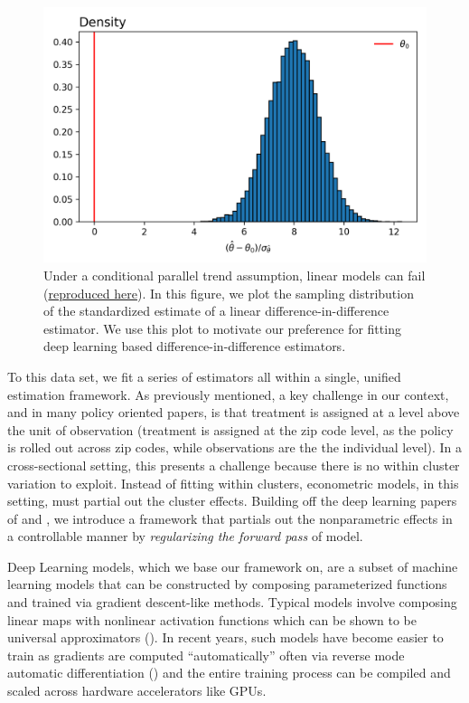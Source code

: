 \documentclass[a4paper,12pt]{article}
\begin{document}
\begin{figure}[htbp]
\centering
    \centering
    \includegraphics[width=.50\linewidth]{figures/framework/linear_diff_n_diff2.png}
    \caption{Under a conditional parallel trend assumption, linear models can fail (\href{https://github.com/pharringtonp19/evictions/blob/main/notebooks/Linear_Failures.ipynb}{reproduced here}). In this figure, we plot the sampling distribution of the standardized estimate of a linear difference-in-difference estimator. We use this plot to motivate our preference for fitting deep learning based difference-in-difference estimators.}
    \label{fig:linear_failures}
\end{figure}
To this data set, we fit a series of estimators all within a single, unified estimation framework. As previously mentioned, a key challenge in our context, and in many policy oriented papers, is that treatment is assigned at a level above the unit of observation (treatment is assigned at the zip code level, as the policy is rolled out across zip codes, while observations are the the individual level). In a cross-sectional setting, this presents a challenge because there is no within cluster variation to exploit. Instead of fitting within clusters, econometric models, in this setting, must partial out the cluster effects. Building off the deep learning papers of \cite{finn2017model} and \cite{kelly2020learning}, we introduce a framework that partials out the nonparametric effects in a controllable manner by \textit{regularizing the forward pass} of model. \par 
Deep Learning models, which we base our framework on, are a subset of machine learning models that can be constructed by composing parameterized functions and trained via gradient descent-like methods. Typical models involve composing linear maps with nonlinear activation functions which can be shown to be universal approximators  (\cite{hornik1989multilayer}). In recent years, such models have become easier to train as gradients are computed ``automatically'' often via reverse mode automatic differentiation (\cite{griewank2008evaluating}) and the entire training process can be compiled and scaled across hardware accelerators like GPUs. \par 
\end{document}
